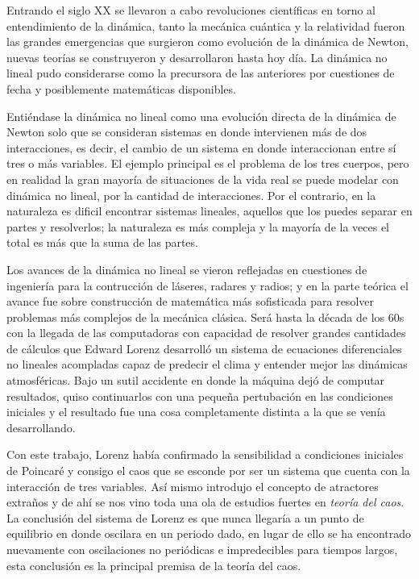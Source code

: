 \documentclass[11pt,a4paper]{article}
\begin{document}
Entrando el siglo XX se llevaron a cabo revoluciones científicas en torno al entendimiento de la dinámica, tanto la mecánica cuántica y la relatividad fueron las grandes emergencias que surgieron como evolución de la dinámica de Newton, nuevas teorías se construyeron y desarrollaron hasta hoy día. La dinámica no lineal pudo considerarse como la precursora de las anteriores por cuestiones de fecha y posiblemente matemáticas disponibles. 

Entiéndase la dinámica no lineal como una evolución directa de la dinámica de Newton solo que se consideran sistemas en donde intervienen más de dos interacciones, es decir, el cambio de un sistema en donde interaccionan entre sí tres o más variables. El ejemplo principal es el problema de los tres cuerpos, pero en realidad la gran mayoría de situaciones de la vida real se puede modelar con dinámica no lineal, por la cantidad de interacciones. Por el contrario, en la naturaleza es dificil encontrar sistemas lineales, aquellos que los puedes separar en partes y resolverlos; la naturaleza es más compleja y la mayoría de la veces el total es más que la suma de las partes.

Los avances de la dinámica no lineal se vieron reflejadas en cuestiones de ingeniería para la contrucción de láseres, radares y radios; y en la parte teórica el avance fue sobre construcción de matemática más sofisticada para resolver problemas más complejos de la mecánica clásica. Será hasta la década de los 60s con la llegada de las computadoras con capacidad de resolver grandes cantidades de cálculos que Edward Lorenz desarrolló un sistema de ecuaciones diferenciales no lineales acompladas capaz de predecir el clima y entender mejor las dinámicas atmosféricas. Bajo un sutil accidente en donde la máquina dejó de computar resultados, quiso continuarlos con una pequeña pertubación en las condiciones iniciales y el resultado fue una cosa completamente distinta a la que se venía desarrollando.

Con este trabajo, Lorenz había confirmado la sensibilidad a condiciones iniciales de Poincaré y consigo el caos que se esconde por ser un sistema que cuenta con la interacción de tres variables. Así mismo introdujo el concepto de atractores extraños y de ahí se nos vino toda una ola de estudios fuertes en \emph{teoría del caos}. La conclusión del sistema de Lorenz es que nunca llegaría a un punto de equilibrio en donde oscilara en un periodo dado, en lugar de ello se ha encontrado nuevamente con oscilaciones no periódicas e impredecibles para tiempos largos, esta conclusión es la principal premisa de la teoría del caos.
\end{document}
